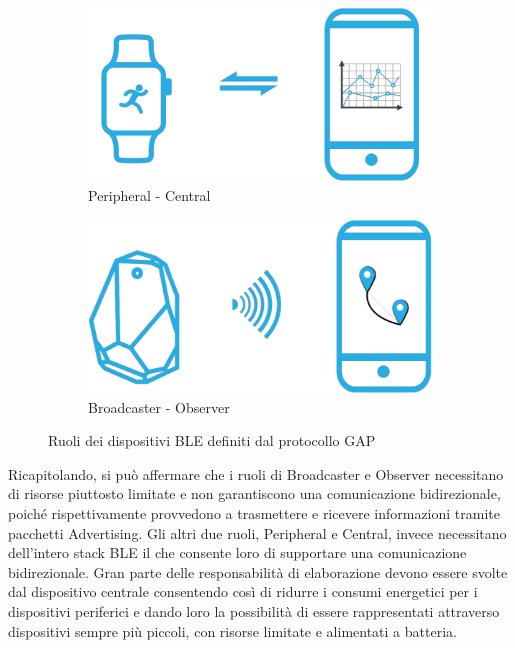 \begin{figure}[!ht]
    \begin{subfigure}{0.5\textwidth}
        \centering
        \includegraphics[width=0.85\linewidth]{images/Peripheral - Master.png} 
        \caption{Peripheral - Central}
        \label{fig:subim1}
    \end{subfigure}
    \begin{subfigure}{0.5\textwidth}
        \centering
        \includegraphics[width=0.85\linewidth]{images/Broadcaster - Observer.png}
        \caption{Broadcaster - Observer}
        \label{fig:subim2}
    \end{subfigure}
    \caption{Ruoli dei dispositivi BLE definiti dal protocollo GAP}
    \label{fig:GAP_roles}
\end{figure}

\noindent Ricapitolando, si può affermare che i ruoli di Broadcaster e Observer necessitano di risorse piuttosto limitate e non garantiscono una comunicazione bidirezionale, poiché rispettivamente provvedono a trasmettere e ricevere informazioni tramite pacchetti Advertising. Gli altri due ruoli, Peripheral e Central, invece necessitano dell'intero stack BLE il che consente loro di supportare una comunicazione bidirezionale. Gran parte delle responsabilità di elaborazione devono essere svolte dal dispositivo centrale consentendo così di ridurre i consumi energetici per i dispositivi periferici e dando loro la possibilità di essere rappresentati attraverso dispositivi sempre più piccoli, con risorse limitate e alimentati a batteria.

